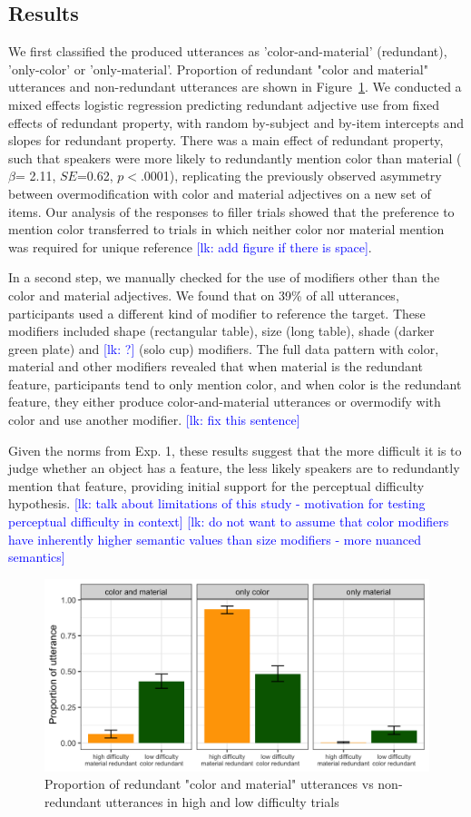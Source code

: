 \documentclass[12pt,letterpaper]{article}
\newcommand{\lk}[1]{\textcolor{Blue}{[lk: #1]}}
\begin{document}
\subsection{Results}

We first classified the produced utterances as 'color-and-material' (redundant), 'only-color' or 'only-material'. Proportion of redundant "color and material" utterances and non-redundant utterances are shown in Figure~\ref{fig:exp2_proportion}. We conducted a mixed effects logistic regression predicting redundant adjective use from fixed effects of redundant property, with random by-subject and by-item intercepts and slopes for redundant property. There was a main effect of redundant property, such that speakers were more likely to redundantly mention color than material ($\beta$= 2.11, $SE$=0.62, $p$$<$.0001), replicating the previously observed asymmetry between overmodification with color and material adjectives on a new set of items. Our analysis of the responses to filler trials showed that the preference to mention color transferred to trials in which neither color nor material mention was required for unique reference \lk{add figure if there is space}. 

In a second step, we manually checked for the use of modifiers other than the color and material adjectives. We found that on 39\% of all utterances, participants used a different kind of modifier to reference the target. These modifiers included shape (rectangular table), size (long table), shade (darker green plate) and \lk{?} (solo cup) modifiers. The full data pattern with color, material and other modifiers revealed that when material is the redundant feature, participants tend to only mention color, and when color is the redundant feature, they either produce color-and-material utterances or overmodify with color and use another modifier. \lk{fix this sentence}

Given the norms from Exp. 1, these results suggest that the more difficult it is to judge whether an object has a feature, the less likely speakers are to redundantly mention that feature, providing initial support for the perceptual difficulty hypothesis. 
\lk{talk about limitations of this study - motivation for testing perceptual difficulty in context}
\lk{do not want to assume that color modifiers have inherently higher semantic values than size modifiers - more nuanced semantics}

\begin{figure}[ht]
\centering
\includegraphics[width=.7\textwidth]{plots/exp2_proportion.png}
\caption{Proportion of redundant "color and material" utterances vs non-redundant utterances in high and low difficulty trials}
\label{fig:exp2_proportion}
\end{figure}
\end{document}
